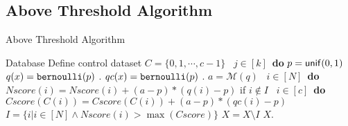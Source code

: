 \documentclass[a4paper,11pt]{article}
\begin{document}
\subsection{Above Threshold Algorithm}
%
\begin{algorithm}
\footnotesize
\caption{Above Threshold Algorithm}
\label{alg:abovethd}
\begin{algorithmic}
\REQUIRE Database
\STATE Define control dataset $C = \{0,1, \cdots, c - 1\}$
\STATE 
{}\ $j\in [k]$\ {\bf do} 
\STATE {} $p=\mathsf{unif}(0,1)$ 
\STATE {} $q (x) = \mathtt{bernoulli} ( p )$ .
\STATE {} $qc (x) = \mathtt{bernoulli} ( p )$ .
\STATE {} $a = \mathcal{M}(q)$ 
\STATE {}\ $i \in [N]$\ {\bf do}
\STATE \qquad \qquad $Nscore(i) = Nscore(i) + (a - p)*(q (i) - p)$ if $i \notin I$
\STATE {}\ $i \in [c]$\ {\bf do}
\STATE \qquad \qquad $Cscore(C(i)) = Cscore(C(i)) + (a - p)*(qc (i) - p)$
\STATE {} $I = \{i | i\in [N] \land Nscore(i) > \max(Cscore)\}$
\STATE {} $X = X \setminus I$ 
\RETURN $X$.
\end{algorithmic}
\end{algorithm}
%

\newpage


\end{document}
